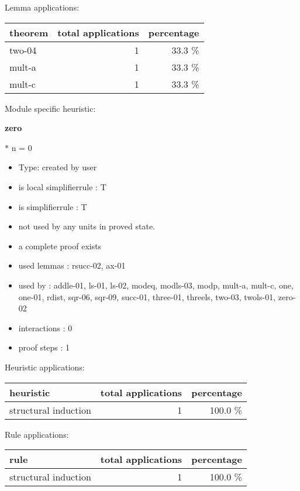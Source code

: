 \documentclass[a4paper]{article}
\begin{document}
Lemma applications:

\begin{supertabular}{l|r|r}
theorem	        & total applications & percentage \\ \hline
two-04 & 1 & 33.3 \% \\
mult-a & 1 & 33.3 \% \\
mult-c & 1 & 33.3 \% \\

\end{supertabular}

Module specific heuristic:

\pagebreak

{\LARGE\bf zero}\label{lemma-zero}

\medskip

  $*$ n = 0

\begin{itemize}

\item Type: created by user

\item is local simplifierrule : T
\item is simplifierrule : T
\item not used by any units in proved state.
\item       a complete proof exists
\item       used lemmas  : rsucc-02, ax-01
\item       used by      : addle-01, ls-01, ls-02, modeq, modls-03, modp, mult-a, mult-c, one, one-01, rdist, sqr-06, sqr-09, succ-01, three-01, threels, two-03, twols-01, zero-02
\item       interactions : 0
\item       proof steps  : 1
\end{itemize}

\medskip


Heuristic applications:

\begin{supertabular}{l|r|r}
heuristic	& total applications & percentage \\ \hline
structural induction & 1 & 100.0 \% \\

\end{supertabular}

Rule applications:

\begin{supertabular}{l|r|r}
rule	        & total applications & percentage \\ \hline
structural induction & 1 & 100.0 \% \\

\end{supertabular}
\end{document}

